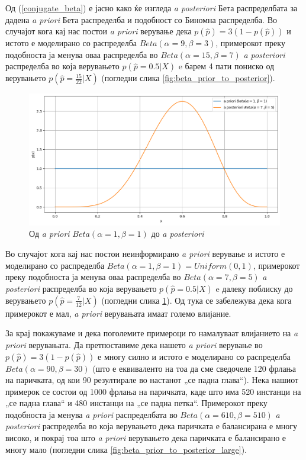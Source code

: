 \documentclass[12pt]{article}
\numberwithin{equation}{section}
\begin{document}
Од (\ref{conjugate_beta}) е јасно како ќе изгледа \textit{a posteriori} Бета распределбата за дадена \textit{a priori} Бета распределба и подобност со Биномна распределба. Во случајот кога кај нас постои \textit{a priori} верување дека \(p(\widehat{p}) = 3(1 - p(\widehat{p}))\) и истото е моделирано со распределба \(Beta(\alpha=9, \beta=3)\), примерокот преку подобноста ја менува оваа распределба во \(Beta(\alpha=15, \beta=7)\) \textit{a posteriori} распределба во која верувањето \(p(\widehat{p} = 0.5 | X)\) e барем 4 пати пониско од верувањето \(p(\widehat{p} = \frac{15}{22} | X)\) (погледни слика \ref{fig:beta_prior_to_posterior}).

\begin{figure}[h]
    \centering
    \includegraphics[width=1\textwidth]{plots/uniform_prior_to_posterior.png}
    \caption{Од \textit{a priori} \(Beta(\alpha=1, \beta=1)\) до \textit{a posteriori}}
    \label{fig:uniform_prior_to_posterior}
\end{figure}

Во случајот кога кај нас постои неинформирано \textit{a priori} верување и истото е моделирано со распределба \(Beta(\alpha=1, \beta=1) = Uniform(0, 1)\), примерокот преку подобноста ја менува оваа распределба во \(Beta(\alpha=7, \beta=5)\) \textit{a posteriori} распределба во која верувањето \(p(\widehat{p} = 0.5 | X)\) e далеку поблиску до верувањето \(p(\widehat{p} = \frac{7}{12} | X)\) (погледни слика \ref{fig:uniform_prior_to_posterior}). Од тука се забележува дека кога примерокот е мал, \textit{a priori} верувањата имаат големо влијание.

За крај покажуваме и дека поголемите примероци го намалуваат влијанието на \textit{a priori} верувањата. Да претпоставиме дека нашето \textit{a priori} верување во \(p(\widehat{p}) = 3(1 - p(\widehat{p}))\) е многу силно и истото е моделирано со распределба \(Beta(\alpha=90, \beta=30)\) (што е еквиваленто на тоа да сме сведочеле 120 фрлања на паричката, од кои 90 резултирале во настанот „се падна глава“). Нека нашиот примерок се состои од 1000 фрлања на паричката, каде што има 520 инстанци на „се падна глава“ и 480 инстанци на „се падна петка“. Примерокот преку подобноста ја менува \textit{a priori} распределбата во \(Beta(\alpha=610, \beta=510)\) \textit{a posteriori} распределба во која верувањето дека паричката е балансирана е многу високо, и покрај тоа што \textit{a priori} верувањето дека паричката е балансирано е многу мало (погледни слика \ref{fig:beta_prior_to_posterior_large}).
\end{document}
